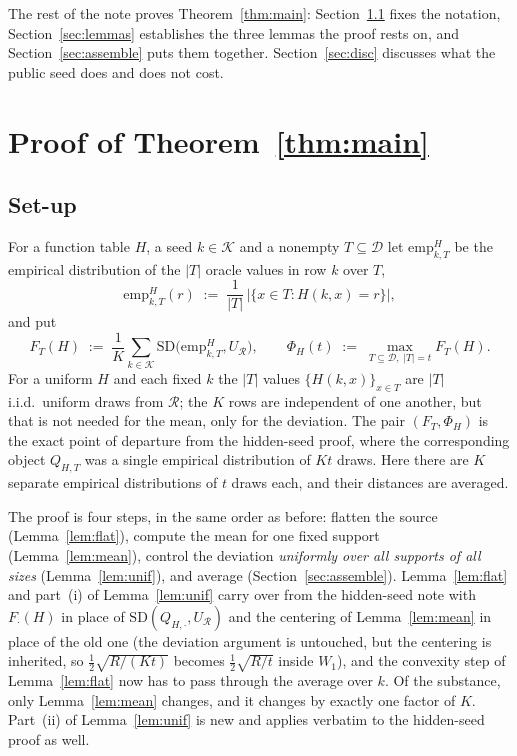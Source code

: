 \documentclass{aicr-solution}
\newcommand{\SD}{\mathrm{SD}}
\newcommand{\calK}{\mathcal{K}}
\newcommand{\calD}{\mathcal{D}}
\newcommand{\calR}{\mathcal{R}}
\newcommand{\emp}{\mathrm{emp}}
\begin{document}
The rest of the note proves Theorem~\ref{thm:main}: Section~\ref{sec:setup} fixes the notation,
Section~\ref{sec:lemmas} establishes the three lemmas the proof rests on, and
Section~\ref{sec:assemble} puts them together. Section~\ref{sec:disc} discusses what the public
seed does and does not cost.

\section{Proof of Theorem~\ref{thm:main}}\label{sec:proof}

\subsection{Set-up}\label{sec:setup}

For a function table $H$, a seed $k \in \calK$ and a nonempty $T \subseteq \calD$ let
$\emp^{H}_{k,T}$ be the empirical distribution of the $|T|$ oracle values in row $k$ over $T$,
\[
  \emp^{H}_{k,T}(r) \;:=\; \frac{1}{|T|}\,\bigl|\{x \in T : H(k,x) = r\}\bigr| ,
\]
and put
\[
  F_{T}(H) \;:=\; \frac{1}{K}\sum_{k \in \calK} \SD\bigl(\emp^{H}_{k,T}, U_{\calR}\bigr),
  \qquad
  \Phi_{H}(t) \;:=\; \max_{T \subseteq \calD,\; |T| = t} F_{T}(H) .
\]
For a uniform $H$ and each fixed $k$ the $|T|$ values $\{H(k,x)\}_{x \in T}$ are $|T|$ i.i.d.\
uniform draws from $\calR$; the $K$ rows are independent of one another, but that is not needed for
the mean, only for the deviation. The pair $(F_{T}, \Phi_{H})$ is the exact point of departure from the hidden-seed proof,
where the corresponding object $Q_{H,T}$ was a single empirical distribution of $Kt$ draws. Here
there are $K$ separate empirical distributions of $t$ draws each, and their distances are averaged.

\smallskip
The proof is four steps, in the same order as before: flatten the source (Lemma~\ref{lem:flat}),
compute the mean for one fixed support (Lemma~\ref{lem:mean}), control the deviation \emph{uniformly
over all supports of all sizes} (Lemma~\ref{lem:unif}), and average (Section~\ref{sec:assemble}).
Lemma~\ref{lem:flat} and part~(i) of Lemma~\ref{lem:unif} carry over from the hidden-seed note with
$F_{\cdot}(H)$ in place of $\SD(Q_{H,\cdot},U_{\calR})$ and the centering of
Lemma~\ref{lem:mean} in place of the old one (the deviation argument is untouched, but the
centering is inherited, so $\tfrac12\sqrt{R/(Kt)}$ becomes $\tfrac12\sqrt{R/t}$ inside $W_{1}$),
and the convexity step of Lemma~\ref{lem:flat} now has to pass through the average over $k$. Of the
substance, only Lemma~\ref{lem:mean} changes, and it changes by exactly one factor of $K$.
Part~(ii) of Lemma~\ref{lem:unif} is new and applies verbatim to the hidden-seed proof as well.
\end{document}
